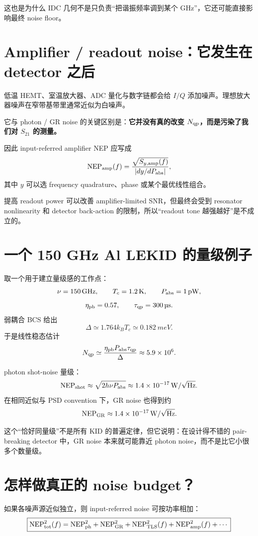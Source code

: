 \documentclass[11pt,a4paper,openany]{ctexrep}
\begin{document}
这也是为什么 IDC 几何不是只负责“把谐振频率调到某个 GHz”，它还可能直接影响最终 noise floor。

\section{Amplifier / readout noise：它发生在 detector 之后}

低温 HEMT、室温放大器、ADC 量化与数字链都会给 $I/Q$ 添加噪声。理想放大器噪声在窄带基带里通常近似为白噪声。

它与 photon / GR noise 的关键区别是：\textbf{它并没有真的改变 $N_{\rm qp}$，而是污染了我们对 $S_{21}$ 的测量。}

因此 input-referred amplifier NEP 应写成
\[
\mathrm{NEP}_{\rm amp}(f)
=
\frac{\sqrt{S_{y,\rm amp}(f)}}
{|dy/dP_{\rm abs}|},
\]
其中 $y$ 可以选 frequency quadrature、phase 或某个最优线性组合。

提高 readout power 可以改善 amplifier-limited SNR，但最终会受到 resonator nonlinearity 和 detector back-action 的限制，所以“readout tone 越强越好”是不成立的。

\section{一个 150 GHz Al LEKID 的量级例子}

取一个用于建立量级感的工作点：
\[
\nu=\SI{150}{GHz},\qquad
T_c=\SI{1.2}{K},\qquad
P_{\rm abs}=\SI{1}{pW},
\]
\[
\eta_{\rm pb}=0.57,\qquad
\tau_{\rm qp}=\SI{300}{\micro s}.
\]
弱耦合 BCS 给出
\[
\Delta\simeq1.764k_BT_c\simeq\SI{0.182}{meV}.
\]
于是线性稳态估计
\[
N_{\rm qp}
\simeq
\frac{\eta_{\rm pb}P_{\rm abs}\tau_{\rm qp}}{\Delta}
\approx 5.9\times10^6.
\]

photon shot-noise 量级：
\[
\mathrm{NEP}_{\rm shot}
\approx
\sqrt{2h\nu P_{\rm abs}}
\approx
1.4\times10^{-17}\,\mathrm{W}/\sqrt{\mathrm{Hz}}.
\]
在相同近似与 PSD convention 下，GR noise 也得到约
\[
\mathrm{NEP}_{\rm GR}
\approx
1.4\times10^{-17}\,\mathrm{W}/\sqrt{\mathrm{Hz}}.
\]

这个“恰好同量级”不是所有 KID 的普遍定律，但它说明：在设计得不错的 pair-breaking detector 中，GR noise 本来就可能靠近 photon noise，而不是比它小很多个数量级。

\section{怎样做真正的 noise budget？}

如果各噪声源近似独立，则 input-referred noise 可按功率相加：
\[
\boxed{
\mathrm{NEP}_{\rm tot}^2(f)
=
\mathrm{NEP}_{\rm ph}^2
+
\mathrm{NEP}_{\rm GR}^2
+
\mathrm{NEP}_{\rm TLS}^2(f)
+
\mathrm{NEP}_{\rm amp}^2(f)
+\cdots
}
\]
\end{document}

